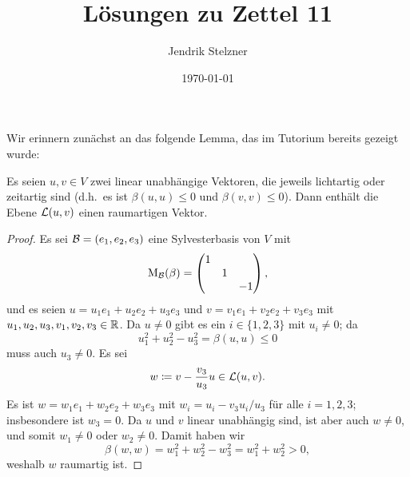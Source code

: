 \documentclass[a4paper,10pt,numbers=noenddot]{scrartcl}
\title{Lösungen zu Zettel 11}
\author{Jendrik Stelzner}
\date{\today}
\begin{document}
\maketitle


Wir erinnern zunächst an das folgende Lemma, das im Tutorium bereits gezeigt wurde:


\begin{lemma}\label{lem: existence of spacelike vectors}
  Es seien $u, v \in V$ zwei linear unabhängige Vektoren, die jeweils lichtartig oder zeitartig sind (d.h.\ es ist $\beta(u,u) \leq 0$ und $\beta(v,v) \leq 0$).
  Dann enthält die Ebene $\operatorname{\mathcal{L}}(u,v)$ einen raumartigen Vektor.
\end{lemma}
\begin{proof}
  Es sei $\mathcal{B} = (e_1, e_2, e_3)$ eine Sylvesterbasis von $V$ mit
  \[
    \operatorname{M}_{\mathcal{B}}(\beta)
    =
    \begin{pmatrix}
      1 &   &     \\
        & 1 &     \\
        &   & -1
    \end{pmatrix},
  \]
  und es seien $u = u_1 e_1 + u_2 e_2 + u_3 e_3$ und $v = v_1 e_1 + v_2 e_2 + v_3 e_3$ mit $u_1, u_2, u_3, v_1, v_2, v_3 \in \mathbb{R}$.
  Da $u \neq 0$ gibt es ein $i \in \{1, 2, 3\}$ mit $u_i \neq 0$; da
  \[
      u_1^2 + u_2^2 - u_3^2
    = \beta(u,u)
    \leq 0
  \]
  muss auch $u_3 \neq 0$.
  Es sei 
  \[
              w
    \coloneqq v - \frac{v_3}{u_3} u
    \in       \operatorname{\mathcal{L}}(u, v).
  \]
  Es ist $w = w_1 e_1 + w_2 e_2 + w_3 e_3$ mit $w_i = u_i - v_3 u_i / u_3$ für alle $i = 1, 2, 3$; insbesondere ist $w_3 = 0$.
  Da $u$ und $v$ linear unabhängig sind, ist aber auch $w \neq 0$, und somit $w_1 \neq 0$ oder $w_2 \neq 0$.
  Damit haben wir
  \[
      \beta(w,w)
    = w_1^2 + w_2^2 - w_3^2
    = w_1^2 + w_2^2
    > 0,
  \]
  weshalb $w$ raumartig ist.
\end{proof}










\addtocounter{section}{2}










\section{}
\end{document}
